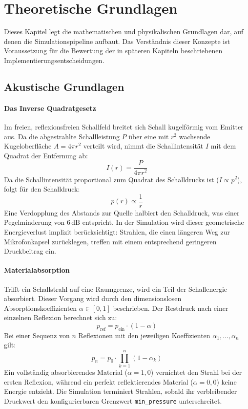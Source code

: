 \documentclass{article}
\begin{document}
    \tableofcontents
    \newpage

    \section{Theoretische Grundlagen}
    \label{sec:grundlagen}

    Dieses Kapitel legt die mathematischen und physikalischen Grundlagen dar,
    auf denen die Simulationspipeline aufbaut.
    Das Verständnis dieser Konzepte ist Voraussetzung für die Bewertung der
    in späteren Kapiteln beschriebenen Implementierungsentscheidungen.

    \subsection{Akustische Grundlagen}
    \label{subsec:akustik}

    \paragraph{Das Inverse Quadratgesetz}

    Im freien, reflexionsfreien Schallfeld breitet sich Schall kugelförmig vom Emitter aus.
    Da die abgestrahlte Schallleistung $P$ über eine mit $r^2$ wachsende Kugeloberfläche
    $A = 4\pi r^2$ verteilt wird, nimmt die Schallintensität $I$ mit dem Quadrat der Entfernung ab:
    \[I(r) = \frac{P}{4\pi r^2}\]
    Da die Schallintensität proportional zum Quadrat des Schalldrucks ist ($I \propto p^2$),
    folgt für den Schalldruck:
    \[p(r) \propto \frac{1}{r}\]
    Eine Verdopplung des Abstands zur Quelle halbiert den Schalldruck, was einer
    Pegelminderung von $6\,\text{dB}$ entspricht.
    In der Simulation wird dieser geometrische Energieverlust implizit berücksichtigt:
    Strahlen, die einen längeren Weg zur Mikrofonkapsel zurücklegen, treffen mit einem
    entsprechend geringeren Druckbeitrag ein.

    \paragraph{Materialabsorption}

    Trifft ein Schallstrahl auf eine Raumgrenze, wird ein Teil der Schallenergie absorbiert.
    Dieser Vorgang wird durch den dimensionslosen Absorptionskoeffizienten $\alpha \in [0{,}1]$
    beschrieben. Der Restdruck nach einer einzelnen Reflexion berechnet sich zu:
    \[p_{\text{ref}} = p_{\text{ein}} \cdot (1 - \alpha)\]
    Bei einer Sequenz von $n$ Reflexionen mit den jeweiligen Koeffizienten
    $\alpha_1, \ldots, \alpha_n$ gilt:
    \[p_n = p_0 \cdot \prod_{k=1}^{n}(1 - \alpha_k)\]
    Ein vollständig absorbierendes Material ($\alpha = 1{,}0$) vernichtet den Strahl bei der
    ersten Reflexion, während ein perfekt reflektierendes Material ($\alpha = 0{,}0$) keine
    Energie entzieht. Die Simulation terminiert Strahlen, sobald ihr verbleibender Druckwert
    den konfigurierbaren Grenzwert \texttt{min\_pressure} unterschreitet.
\end{document}
